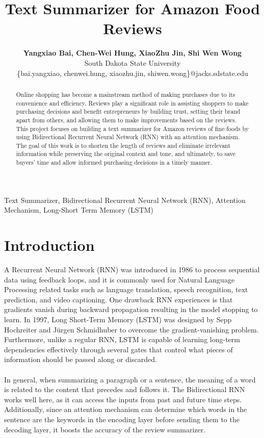 \documentclass[conference]{IEEEtran}
\begin{document}
\title{\textbf{Text Summarizer for Amazon Food Reviews}\\}
\author{\textbf{\Large{Yangxiao Bai, Chen-Wei Hung, XiaoZhu Jin, Shi Wen Wong}} \\
South Dakota State University \\
\{bai.yangxiao, chenwei.hung, xiaozhu.jin, shiwen.wong\}@jacks.sdstate.edu \\
}

\maketitle

\begin{abstract}
Online shopping has become a mainstream method of making purchases due to its convenience and efficiency. Reviews play a significant role in assisting shoppers to make purchasing decisions and benefit entrepreneurs by building trust, setting their brand apart from others, and allowing them to make improvements based on the reviews. This project focuses on building a text summarizer for Amazon reviews of fine foods by using Bidirectional Recurrent Neural Network (RNN) with an attention mechanism. The goal of this work is to shorten the length of reviews and eliminate irrelevant information while preserving the original context and tone, and ultimately, to save buyers’ time and allow informed purchasing decisions in a timely manner. \\
\end{abstract} 

\begin{IEEEkeywords}
Text Summarizer, Bidirectional Recurrent Neural Network (RNN), Attention Mechanism, Long-Short Term Memory (LSTM)
\end{IEEEkeywords}

\section{Introduction}
A Recurrent Neural Network (RNN) was introduced in 1986 to process sequential data using feedback loops, and it is commonly used for Natural Language Processing related tasks such as language translation, speech recognition, text prediction, and video captioning\cite{LSTM}. One drawback RNN experiences is that gradients vanish during backward propagation resulting in the model stopping to learn. In 1997, Long Short-Term Memory (LSTM) was designed by Sepp Hochreiter and J\"{u}rgen Schmidhuber to overcome the gradient-vanishing problem. Furthermore, unlike a regular RNN, LSTM is capable of learning long-term dependencies effectively through several gates that control what pieces of information should be passed along or discarded. \\ \\
\indent In general, when summarizing a paragraph or a sentence, the meaning of a word is related to the content that precedes and follows it. The Bidirectional RNN works well here, as it can access the inputs from past and future time steps. Additionally, since an attention mechanism can determine which words in the sentence are the keywords in the encoding layer before sending them to the decoding layer\cite{AIAYN}, it boosts the accuracy of the review summarizer.
\end{document}
